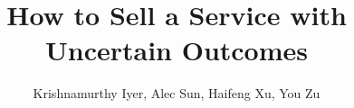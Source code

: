 \documentclass[11pt]{article}
\title{How to Sell a Service with Uncertain Outcomes}
\author{Krishnamurthy Iyer, Alec Sun, Haifeng Xu, You Zu}
\begin{document}
\begin{titlepage}
\maketitle

\end{titlepage}






\appendix

\end{document}
